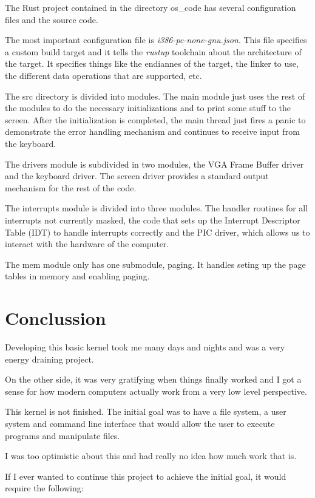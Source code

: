 \documentclass[12pt]{article}
\begin{document}
The Rust project contained in the directory os\_code has several configuration 
files and the source code.

The most important configuration file is \textit{i386-pc-none-gnu.json}. This
file specifies a custom build target and it tells the \textit{rustup} 
toolchain about the architecture of the target. It specifies things like 
the endiannes of the target, the linker to use, the different data operations
that are supported, etc.

The src directory is divided into modules. The main module just uses the rest
of the modules to do the necessary initializations and to print some stuff to
the screen. After the initialization is completed, the main thread just
fires a panic to demonstrate the error handling mechanism and continues to
receive input from the keyboard.

The drivers module is subdivided in two modules, the VGA Frame Buffer driver
and the keyboard driver. The screen driver provides a standard output mechanism 
for the rest of the code.

The interrupts module is divided into three modules. The handler routines
for all interrupts not currently masked, the code that sets up the 
Interrupt Descriptor Table (IDT) to handle interrupts correctly and the PIC
driver, which allows us to interact with the hardware of the computer.

The mem module only has one submodule, paging. It handles seting up 
the page tables in memory and enabling paging.

\section*{Conclussion}

Developing this basic kernel took me many days and nights and was a very 
energy draining project. 

On the other side, it was very
gratifying when things finally worked and I got a sense for how modern 
computers actually work from a very low level perspective.

This kernel is not finished. The initial goal was to have a file system,
a user system and command line interface that would allow the user to 
execute programs and manipulate files.

I was too optimistic about this and had really no idea how much work that is.

If I ever wanted to continue this project to achieve the initial goal, it 
would require the following:
\end{document}
